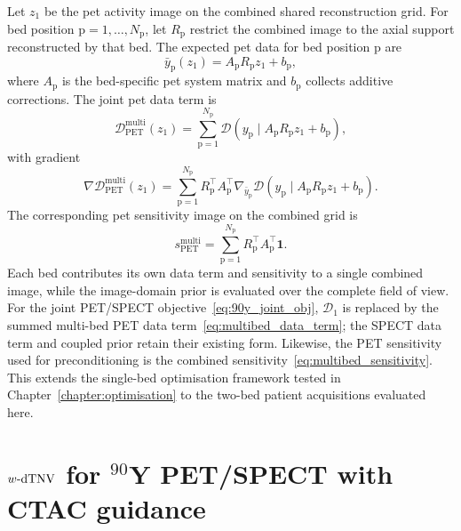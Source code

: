 Let $z_1$ be the \gls{pet} activity image on the combined shared reconstruction grid. For bed position $\mathrm{p}=1,\ldots,N_{\mathrm{p}}$, let $R_{\mathrm{p}}$ restrict the combined image to the axial support reconstructed by that bed. The expected \gls{pet} data for bed position $\mathrm{p}$ are
\begin{equation}
    \bar y_{\mathrm{p}}(z_1)
    =
    A_{\mathrm{p}} R_{\mathrm{p}} z_1 + b_{\mathrm{p}},
    \label{eq:multibed_forward_model}
\end{equation}
where $A_{\mathrm{p}}$ is the bed-specific \gls{pet} system matrix and $b_{\mathrm{p}}$ collects additive corrections. The joint \gls{pet} data term is
\begin{equation}
    \mathcal{D}_{\mathrm{PET}}^{\mathrm{multi}}(z_1)
    =
    \sum_{\mathrm{p}=1}^{N_{\mathrm{p}}}
    \mathcal{D}
    \left(
        y_{\mathrm{p}} \mid A_{\mathrm{p}} R_{\mathrm{p}} z_1 + b_{\mathrm{p}}
    \right),
    \label{eq:multibed_data_term}
\end{equation}
with gradient
\begin{equation}
    \nabla \mathcal{D}_{\mathrm{PET}}^{\mathrm{multi}}(z_1)
    =
    \sum_{\mathrm{p}=1}^{N_{\mathrm{p}}}
    R_{\mathrm{p}}^\top
    A_{\mathrm{p}}^\top
    \nabla_{\bar y_{\mathrm{p}}}
    \mathcal{D}
    \left(
        y_{\mathrm{p}} \mid A_{\mathrm{p}} R_{\mathrm{p}} z_1 + b_{\mathrm{p}}
    \right).
    \label{eq:multibed_gradient}
\end{equation}
The corresponding \gls{pet} sensitivity image on the combined grid is
\begin{equation}
    s_{\mathrm{PET}}^{\mathrm{multi}}
    =
    \sum_{\mathrm{p}=1}^{N_{\mathrm{p}}}
    R_{\mathrm{p}}^\top A_{\mathrm{p}}^\top \bm 1.
    \label{eq:multibed_sensitivity}
\end{equation}
Each bed contributes its own data term and sensitivity to a single combined image, while the image-domain prior is evaluated over the complete field of view. For the joint PET/SPECT objective~\eqref{eq:90y_joint_obj}, $\mathcal{D}_1$ is replaced by the summed multi-bed PET data term~\eqref{eq:multibed_data_term}; the SPECT data term and coupled prior retain their existing form. Likewise, the PET sensitivity used for preconditioning is the combined sensitivity~\eqref{eq:multibed_sensitivity}. This extends the single-bed optimisation framework tested in Chapter~\ref{chapter:optimisation} to the two-bed patient acquisitions evaluated here.

\section{\texorpdfstring{$w\text{-}\mathrm{dTNV}$}{w-dTNV} for $^{90}$Y PET/SPECT with CTAC guidance}
\label{sec:90y_wdtnv}


